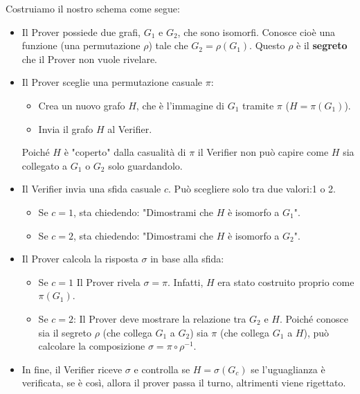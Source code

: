 Costruiamo il nostro schema come segue:
\begin{itemize}
    \item Il Prover possiede due grafi, $G_1$ e $G_2$, che sono isomorfi. Conosce cioè una funzione (una permutazione $\rho$) tale che $G_2 = \rho(G_1)$. Questo $\rho$ è il \textbf{segreto} che il Prover non vuole rivelare.
    \item Il Prover sceglie una permutazione casuale $\pi$: 
    \begin{itemize}
        \item Crea un nuovo grafo $H$, che è l'immagine di $G_1$ tramite $\pi$ ($H = \pi(G_1)$).
        \item Invia il grafo $H$ al Verifier.
    \end{itemize}
    Poiché $H$ è "coperto" dalla casualità di $\pi$ il Verifier non può capire come $H$ sia collegato a $G_1$ o $G_2$ solo guardandolo.
    \item Il Verifier invia una sfida casuale $c$. Può scegliere solo tra due valori:1 o 2.
        \begin{itemize}
            \item Se $c=1$, sta chiedendo: "Dimostrami che $H$ è isomorfo a $G_1$".
            \item Se $c=2$, sta chiedendo: "Dimostrami che $H$ è isomorfo a $G_2$".
        \end{itemize}
    \item Il Prover calcola la risposta $\sigma$ in base alla sfida:
    \begin{itemize}
        \item Se $c=1$ Il Prover rivela $\sigma = \pi$. Infatti, $H$ era stato costruito proprio come $\pi(G_1)$.
        \item Se $c=2$: Il Prover deve mostrare la relazione tra $G_2$ e $H$. Poiché conosce sia il segreto $\rho$ (che collega $G_1$ a $G_2$) sia $\pi$ (che collega $G_1$ a $H$), può calcolare la composizione $\sigma = \pi \circ \rho^{-1}$.
    \end{itemize}
    \item In fine, il Verifier riceve $\sigma$ e controlla se $H = \sigma(G_c)$ se l'uguaglianza è verificata, se è così, allora il prover passa il turno, altrimenti viene rigettato.
\end{itemize}
